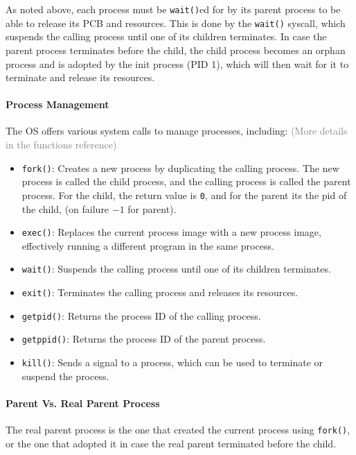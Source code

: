 \documentclass[openany,12pt]{book}
\newcommand{\code}[1]{\texttt{#1}}
\newcommand{\gray}[1]{\textcolor{gray}{#1}}
\begin{document}
\vspace{1em}

As noted above, each process must be \code{wait()}ed for by its parent process to be able to release its PCB and resources. This is done by the \texttt{wait()} syscall, which suspends the calling process until one of its children terminates. In case {\color{red} the parent process terminates before the child}, the child process {\color{red} becomes an orphan process and is adopted by the init process (PID 1)}, which will then wait for it to terminate and release its resources.


\paragraph{Process Management} The OS offers various system calls to manage processes, including: \gray{(More details in the functions reference)}
\begin{itemize}
  \item \texttt{fork()}: Creates a new process by duplicating the calling process. The new process is called the child process, and the calling process is called the parent process. For the child, the return value is \code{0}, and for the parent its the pid of the child, (on failure \(-1\) for parent).
  \item \texttt{exec()}: Replaces the current process image with a new process image, effectively running a different program in the same process.
  \item \texttt{wait()}: Suspends the calling process until one of its children terminates.
  \item \texttt{exit()}: Terminates the calling process and releases its resources.
  \item \texttt{getpid()}: Returns the process ID of the calling process.
  \item \texttt{getppid()}: Returns the process ID of the parent process.
  \item \texttt{kill()}: Sends a signal to a process, which can be used to terminate or suspend the process.
\end{itemize}

\paragraph{Parent Vs. Real Parent Process}
The real parent process is the one that created the current process using \code{fork()}, or the one that adopted it in case the real parent terminated before the child.
\end{document}
